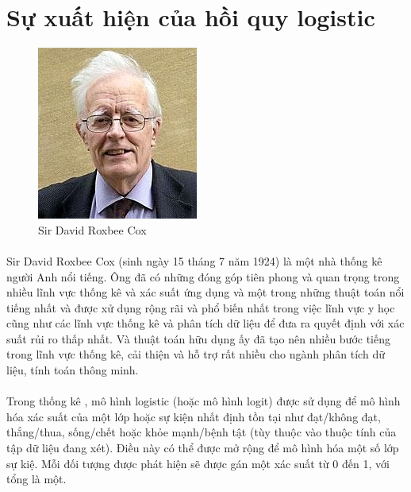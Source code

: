 \documentclass{report}
\begin{document}
    \section{Sự xuất hiện của hồi quy logistic}

        \begin{figure}
            \includegraphics[scale=0.75]{image/s_d_roxbee.jpg}
            \caption{\centering Sir David Roxbee Cox}
        \end{figure}
        
        \fontsize{13}{10}\selectfont\paragraph{}
             Sir David Roxbee Cox (sinh ngày 15 tháng 7 năm 1924) là một nhà thống kê người Anh nổi tiếng. Ông đã có những đóng góp tiên phong và quan trọng trong nhiều lĩnh vực thống kê và xác suất ứng dụng và một trong những thuật toán nổi tiếng nhất và được xử dụng rộng rãi và phổ biến nhất trong việc lĩnh vực y học cũng như các lĩnh vực thống kê và phân tích dữ liệu để đưa ra quyết định với xác suất rủi ro thấp nhất. Và thuật toán hữu dụng ấy đã tạo nên nhiều bước tiếng trong lĩnh vực thống kê, cải thiện và hỗ trợ rất nhiều cho ngành phân tích dữ liệu, tính toán thông minh.
        
        \fontsize{13}{10}\selectfont\paragraph{}
            Trong thống kê , mô hình logistic (hoặc mô hình logit) được sử dụng để mô hình hóa xác suất của một lớp hoặc sự kiện nhất định tồn tại như đạt/không đạt, thắng/thua, sống/chết hoặc khỏe mạnh/bệnh tật (tùy thuộc vào thuộc tính của tập dữ liệu đang xét). Điều này có thể được mở rộng để mô hình hóa một số lớp sự kiệ. Mỗi đối tượng được phát hiện sẽ được gán một xác suất từ 0 đến 1, với tổng là một.
            
\end{document}
